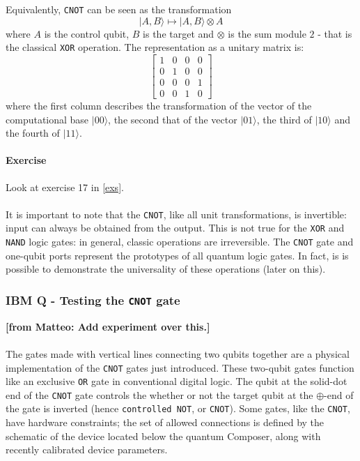 \documentclass[a4paper,10pt]{article}
\newcommand{\from}[2]{{\bf[{\sc from #1:} #2]}}
\begin{document}
Equivalently, \texttt{CNOT} can be seen as the transformation
$$|A,B\rangle \mapsto |A,B\rangle \otimes A$$
where $A$ is the control qubit, $B$ is the target and $\otimes$ is the sum module $2$ - that is the classical \texttt{XOR} operation. The representation as a unitary matrix is:
$$\begin{bmatrix}
1 & 0 & 0 & 0 \\
0 & 1 & 0 & 0 \\
0 & 0 & 0 & 1 \\
0 & 0 & 1 & 0
\end{bmatrix}$$
where the first column describes the transformation of the vector of the computational base $|00\rangle$, the second that of the vector $|01\rangle$, the third of $|10\rangle$ and the fourth of $|11\rangle$.
\paragraph{Exercise} Look at exercise 17 in \autoref{exs}.

\paragraph{} It is important to note that the \texttt{CNOT}, like all unit transformations, is invertible: input can always be obtained from the output. This is not true for the \texttt{XOR} and \texttt{NAND} logic gates: in general, classic operations are irreversible.
The \texttt{CNOT} gate and one-qubit ports represent the prototypes of all quantum logic gates. In fact, is is possible to demonstrate the universality of these operations (later on this).

\subsubsection{IBM Q - Testing the \texttt{CNOT} gate}

\from{Matteo}{Add experiment over this.}

\paragraph{} The gates made with vertical lines connecting two qubits together are a physical implementation of the \texttt{CNOT} gates just introduced. These two-qubit gates function like an exclusive \texttt{OR} gate in conventional digital logic. The qubit at the solid-dot end of the \texttt{CNOT} gate controls the whether or not the target qubit at the $\oplus$-end of the gate is inverted (hence \texttt{controlled NOT}, or \texttt{CNOT}). Some gates, like the \texttt{CNOT}, have hardware constraints; the set of allowed connections is defined by the schematic of the device located below the quantum Composer, along with recently calibrated device parameters.
\end{document}
